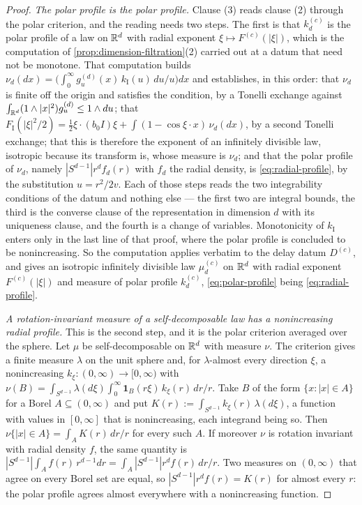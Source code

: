 \begin{proof}
\emph{The polar profile is the polar profile.} Clause (3) reads clause (2) through the polar
criterion, and the reading needs two steps. The first is that $k^{(c)}_d$ is the polar profile of
a law on $\mathbb{R}^d$ with radial exponent $\xi \mapsto F^{(c)}(|\xi|)$, which is the computation of
\ref{prop:dimension-filtration}(2) carried out at a datum that need not be monotone. That
computation builds $\nu_d(dx) = \bigl(\int_0^\infty g^{(d)}_u(x)\,k_{\mathrm I}(u)\,du/u\bigr)dx$
and establishes, in this order: that $\nu_d$ is finite off the origin and satisfies the \Levy{}
condition, by a Tonelli exchange against
$\int_{\mathbb{R}^d}(1 \wedge |x|^2)g^{(d)}_u \le 1 \wedge du$; that
$F_{\mathrm I}(|\xi|^2/2) = \tfrac12\xi\cdot(b_0I)\xi + \int(1 - \cos\xi\cdot x)\,\nu_d(dx)$, by a
second Tonelli exchange; that this is therefore the exponent of an infinitely divisible law,
isotropic because its transform is, whose \Levy{} measure is $\nu_d$; and that the polar profile
of $\nu_d$, namely $|S^{d-1}|r^df_d(r)$ with $f_d$ the radial density, is \ref{eq:radial-profile},
by the substitution $u = r^2/2v$. Each of those steps reads the two integrability conditions of
the datum and nothing else --- the first two are integral bounds, the third is the converse clause
of the representation in dimension $d$ with its uniqueness clause, and the fourth is a change of
variables. Monotonicity of $k_{\mathrm I}$ enters only in the last line of that proof, where the
polar profile is concluded to be nonincreasing. So the computation applies verbatim to the delay
datum $D^{(c)}$, and gives an isotropic infinitely divisible law $\mu^{(c)}_d$ on $\mathbb{R}^d$ with
radial exponent $F^{(c)}(|\xi|)$ and \Levy{} measure of polar profile $k^{(c)}_d$,
\ref{eq:polar-profile} being \ref{eq:radial-profile}.

\emph{A rotation-invariant \Levy{} measure of a self-decomposable law has a nonincreasing radial
profile.} This is the second step, and it is the polar criterion averaged over the sphere. Let
$\mu$ be self-decomposable on $\mathbb{R}^d$ with \Levy{} measure $\nu$. The criterion gives a finite
measure $\lambda$ on the unit sphere and, for $\lambda$-almost every direction $\xi$, a
nonincreasing $k_\xi : (0,\infty) \to [0,\infty)$ with
$\nu(B) = \int_{S^{d-1}}\lambda(d\xi)\int_0^\infty \mathbf 1_B(r\xi)\,k_\xi(r)\,dr/r$. Take $B$ of
the form $\{x : |x| \in A\}$ for a Borel $A \subseteq (0,\infty)$ and put
$K(r) := \int_{S^{d-1}}k_\xi(r)\,\lambda(d\xi)$, a function with values in $[0,\infty]$ that is
nonincreasing, each integrand being so. Then $\nu\{|x| \in A\} = \int_A K(r)\,dr/r$ for every such
$A$. If moreover $\nu$ is rotation invariant with radial density $f$, the same quantity is
$|S^{d-1}|\int_A f(r)\,r^{d-1}dr = \int_A |S^{d-1}|r^df(r)\,dr/r$. Two measures on $(0,\infty)$
that agree on every Borel set are equal, so $|S^{d-1}|r^df(r) = K(r)$ for almost every $r$: the
polar profile agrees almost everywhere with a nonincreasing function.


\end{proof}
